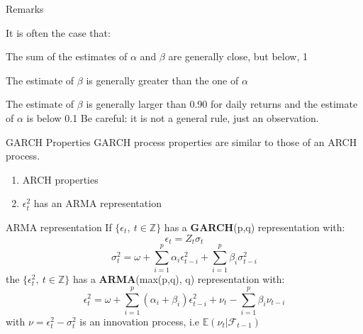 \documentclass{beamer}
\def\Esp{\mathbb{E}}
\def\F{\mathcal{F}}
\newenvironment{wideenumerate}{\enumerate\addtolength{\itemsep}{10pt}}{\endenumerate}
\begin{document}
\begin{frame}{Remarks}

   It is often the case that:
    \begin{wideenumerate}
      \item The sum of the estimates of $\alpha$ and $\beta$ are generally close, but below, 1
      \item The estimate of $\beta$ is generally greater than the one of $\alpha$
      \item The estimate of $\beta$ is generally larger than 0.90 for daily returns and the estimate of $\alpha$ is below 0.1
  \end{wideenumerate}
  Be careful: it is not a general rule, just an observation.
\end{frame}
\begin{frame}{GARCH Properties}
\small
GARCH process properties are similar to those of an ARCH process.
\begin{enumerate}
    \item ARCH properties
    \item $\epsilon_t^2$ has an ARMA representation
\end{enumerate}
\begin{block}{ARMA representation}
  If $\{ \epsilon_t, \ t \in \mathbb{Z} \}$ has a \textbf{GARCH}(p,q) representation with:
  $$\epsilon_t = Z_t \sigma_t$$
  $$\sigma^2_t = \omega + \sum^p_{i=1} \alpha_i \epsilon^2_{t-i} + \sum^p_{i=1} \beta_i \sigma^2_{t-i}$$
  the $\{ \epsilon_t^2, \ t \in \mathbb{Z} \}$ has a \textbf{ARMA}(max(p,q), q) representation with: 
  $$\epsilon^2_t = \omega + \sum^p_{i=1} (\alpha_i + \beta_i) \epsilon^2_{t-i} + \nu_t - \sum^p_{i=1} \beta_i \nu_{t-i}$$
  with $\nu = \epsilon^2_t - \sigma^2_t$ is an innovation process, i.e $\Esp(\nu_t|\F_{t-1})$
\end{block}    
\end{frame}
\end{document}
